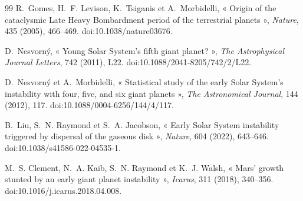 \documentclass[11pt,a4paper,openany]{report}
\begin{document}
\begin{thebibliography}{99}
 R.~Gomes, H.~F. Levison, K.~Tsiganis et A.~Morbidelli, « Origin of the
cataclysmic Late Heavy Bombardment period of the terrestrial planets », \emph{Nature}, 435
(2005), 466--469. doi:10.1038/nature03676.

 D.~Nesvorn\'y, « Young Solar System's fifth giant planet? »,
\emph{The Astrophysical Journal Letters}, 742 (2011), L22. doi:10.1088/2041-8205/742/2/L22.

 D.~Nesvorn\'y et A.~Morbidelli, « Statistical study of the early
Solar System's instability with four, five, and six giant planets », \emph{The Astronomical
Journal}, 144 (2012), 117. doi:10.1088/0004-6256/144/4/117.

 B.~Liu, S.~N. Raymond et S.~A. Jacobson, « Early Solar System instability
triggered by dispersal of the gaseous disk », \emph{Nature}, 604 (2022), 643--646.
doi:10.1038/s41586-022-04535-1.

 M.~S. Clement, N.~A. Kaib, S.~N. Raymond et K.~J. Walsh, « Mars' growth
stunted by an early giant planet instability », \emph{Icarus}, 311 (2018), 340--356.
doi:10.1016/j.icarus.2018.04.008.

\end{thebibliography}
\end{document}

